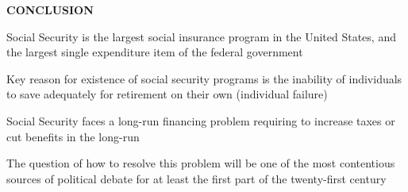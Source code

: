\documentclass[landscape]{slides}
\begin{document}
\begin{slide}

\end{slide}

\begin{slide}
\begin{center}
{\bf CONCLUSION}
\end{center}

Social Security is the largest social insurance program in the United States, and the largest single expenditure item of the federal government

Key reason for existence of social security programs is the inability of individuals to save adequately for retirement
on their own (individual failure)

Social Security faces a long-run financing problem requiring to increase taxes or cut benefits in the long-run

The question of how to resolve this problem will be one of the most contentious sources of political debate for at least the first part of the twenty-first century
\end{slide}
\end{document}
